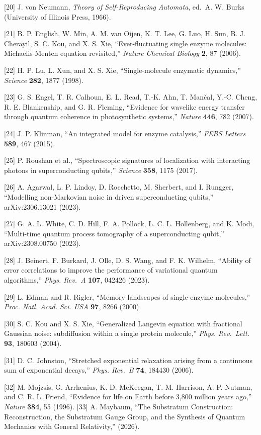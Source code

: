 \documentclass[
]{article}
\begin{document}
{[}20{]} J. von Neumann, \emph{Theory of Self-Reproducing Automata},
ed.~A. W. Burks (University of Illinois Press, 1966).

{[}21{]} B. P. English, W. Min, A. M. van Oijen, K. T. Lee, G. Luo, H.
Sun, B. J. Cherayil, S. C. Kou, and X. S. Xie, ``Ever-fluctuating single
enzyme molecules: Michaelis-Menten equation revisited,'' \emph{Nature
Chemical Biology} \textbf{2}, 87 (2006).

{[}22{]} H. P. Lu, L. Xun, and X. S. Xie, ``Single-molecule enzymatic
dynamics,'' \emph{Science} \textbf{282}, 1877 (1998).

{[}23{]} G. S. Engel, T. R. Calhoun, E. L. Read, T.-K. Ahn, T. Mančal,
Y.-C. Cheng, R. E. Blankenship, and G. R. Fleming, ``Evidence for
wavelike energy transfer through quantum coherence in photosynthetic
systems,'' \emph{Nature} \textbf{446}, 782 (2007).

{[}24{]} J. P. Klinman, ``An integrated model for enzyme catalysis,''
\emph{FEBS Letters} \textbf{589}, 467 (2015).

{[}25{]} P. Roushan et al., ``Spectroscopic signatures of localization
with interacting photons in superconducting qubits,'' \emph{Science}
\textbf{358}, 1175 (2017).

{[}26{]} A. Agarwal, L. P. Lindoy, D. Rocchetto, M. Sherbert, and I.
Rungger, ``Modelling non-Markovian noise in driven superconducting
qubits,'' arXiv:2306.13021 (2023).

{[}27{]} G. A. L. White, C. D. Hill, F. A. Pollock, L. C. L. Hollenberg,
and K. Modi, ``Multi-time quantum process tomography of a
superconducting qubit,'' arXiv:2308.00750 (2023).

{[}28{]} J. Beinert, F. Burkard, J. Olle, D. S. Wang, and F. K. Wilhelm,
``Ability of error correlations to improve the performance of
variational quantum algorithms,'' \emph{Phys. Rev.~A} \textbf{107},
042426 (2023).

{[}29{]} L. Edman and R. Rigler, ``Memory landscapes of single-enzyme
molecules,'' \emph{Proc. Natl. Acad. Sci. USA} \textbf{97}, 8266 (2000).

{[}30{]} S. C. Kou and X. S. Xie, ``Generalized Langevin equation with
fractional Gaussian noise: subdiffusion within a single protein
molecule,'' \emph{Phys. Rev.~Lett.} \textbf{93}, 180603 (2004).

{[}31{]} D. C. Johnston, ``Stretched exponential relaxation arising from
a continuous sum of exponential decays,'' \emph{Phys. Rev.~B}
\textbf{74}, 184430 (2006).

{[}32{]} M. Mojzsis, G. Arrhenius, K. D. McKeegan, T. M. Harrison, A. P.
Nutman, and C. R. L. Friend, ``Evidence for life on Earth before 3,800
million years ago,'' \emph{Nature} \textbf{384}, 55 (1996). {[}33{]} A.
Maybaum, ``The Substratum Construction: Reconstruction, the Substratum
Gauge Group, and the Synthesis of Quantum Mechanics with General
Relativity,'' (2026).
\end{document}
